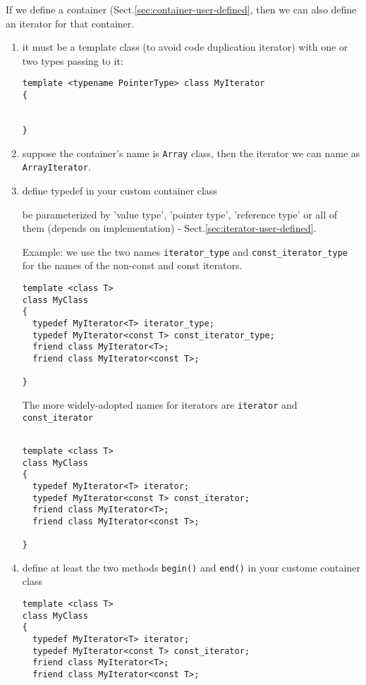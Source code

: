 If we define a container (Sect.\ref{sec:container-user-defined}, then we can
also define an iterator for that container.
\begin{enumerate}
  
  \item it must be a template class (to avoid code duplication iterator) with
  one or two types passing to it:

\begin{lstlisting}
template <typename PointerType> class MyIterator 
{


}
\end{lstlisting}
  
  \item suppose the container's name is \verb!Array! class, then the iterator we
  can name as \verb!ArrayIterator!.
  
  \item define typedef in your custom container class
  
  be parameterized by 'value type', 'pointer type', 'reference type' or
  all of them (depends on implementation) - Sect.\ref{sec:iterator-user-defined}.

Example: we use the two names \verb!iterator_type! and
\verb!const_iterator_type! for the names of the non-const and const iterators.

\begin{lstlisting}
template <class T>
class MyClass
{
  typedef MyIterator<T> iterator_type;
  typedef MyIterator<const T> const_iterator_type;
  friend class MyIterator<T>;
  friend class MyIterator<const T>;

}
\end{lstlisting}
   
The more widely-adopted names for iterators are \verb!iterator! and \verb!const_iterator!
\begin{lstlisting}

template <class T>
class MyClass
{
  typedef MyIterator<T> iterator;
  typedef MyIterator<const T> const_iterator;
  friend class MyIterator<T>;
  friend class MyIterator<const T>;

}
\end{lstlisting}

   \item define at least the two methods \verb!begin()! and \verb!end()! in your custome container class
   
\begin{lstlisting}
template <class T>
class MyClass
{
  typedef MyIterator<T> iterator;
  typedef MyIterator<const T> const_iterator;
  friend class MyIterator<T>;
  friend class MyIterator<const T>;
  

\end{lstlisting}
\end{enumerate}
